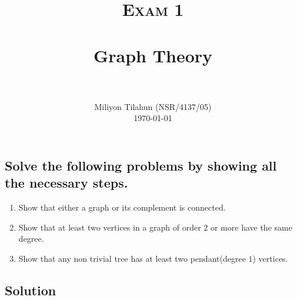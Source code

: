 \documentclass[paper=a4, fontsize=12pt]{scrartcl} %
\title{
		\usefont{OT1}{bch}{b}{n}
		\normalfont \normalsize \textsc{Exam 1} \\ [25pt]
		\horrule{0.5pt} \\[0.4cm]
		\huge Graph Theory \\
		\horrule{2pt} \\[0.5cm]
}
\author{
		\normalfont 								\normalsize
        Miliyon Tilahun (NSR/4137/05)\\[-3pt]		\normalsize
        \today
}
\date{}
\theoremstyle{definition}
\theoremstyle{remark}
\begin{document}
\maketitle

\subsection*{Solve the following problems by showing all the necessary steps.}

\begin{enumerate}
  \item Show that either a graph or its complement is connected.
  \item Show that at least two vertices in a graph of order $2$  or more have the same degree.
  \item Show that any non trivial tree has at least two pendant(degree $1$) vertices.
\end{enumerate}

\subsection*{Solution}
\end{document}
